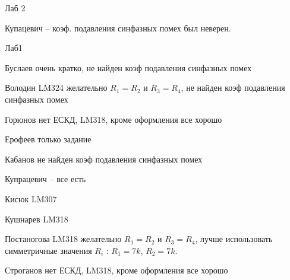 \documentclass[a4paper,11pt]{article}
\begin{document}
\newpage
Лаб 2

Купацевич -- коэф. подавления синфазных помех был неверен.

\newpage
Лаб1 

Буслаев  очень кратко, не найден коэф подавления синфазных помех

Володин LM324  желательно $R_1=R_2$ и $R_3=R_4$, не найден коэф подавления синфазных помех

Горюнов  нет ЕСКД, LM318, кроме оформления все хорошо

Ерофеев только задание

Кабанов  не найден коэф подавления синфазных помех

Купрацевич -- все есть

Кисюк LM307

Кушнарев LM318

Постаногова LM318 желательно $R_1=R_2$ и $R_3=R_4$, лучше использовать симметричные значения $R_i$ : $R_1=7k$, $R_2=7k$. 

Строганов нет ЕСКД, LM318, кроме оформления все хорошо
\end{document}
